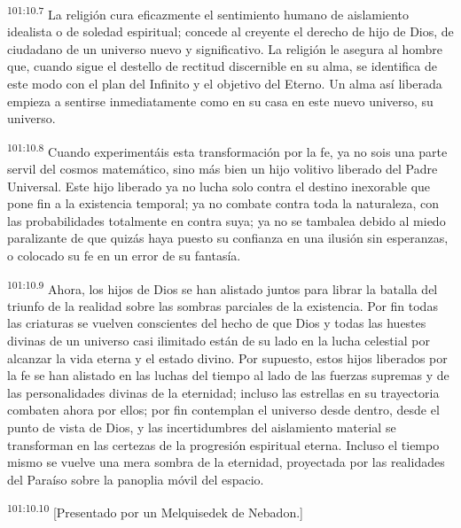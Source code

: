 \documentclass[twoside, 11pt]{book}
\begin{document}
\par
\textsuperscript{101:10.7} La religión cura eficazmente el sentimiento humano de aislamiento idealista o de soledad espiritual; concede al creyente el derecho de hijo de Dios, de ciudadano de un universo nuevo y significativo. La religión le asegura al hombre que, cuando sigue el destello de rectitud discernible en su alma, se identifica de este modo con el plan del Infinito y el objetivo del Eterno. Un alma así liberada empieza a sentirse inmediatamente como en su casa en este nuevo universo, su universo.

\par
\textsuperscript{101:10.8} Cuando experimentáis esta transformación por la fe, ya no sois una parte servil del cosmos matemático, sino más bien un hijo volitivo liberado del Padre Universal. Este hijo liberado ya no lucha solo contra el destino inexorable que pone fin a la existencia temporal; ya no combate contra toda la naturaleza, con las probabilidades totalmente en contra suya; ya no se tambalea debido al miedo paralizante de que quizás haya puesto su confianza en una ilusión sin esperanzas, o colocado su fe en un error de su fantasía.

\par
\textsuperscript{101:10.9} Ahora, los hijos de Dios se han alistado juntos para librar la batalla del triunfo de la realidad sobre las sombras parciales de la existencia. Por fin todas las criaturas se vuelven conscientes del hecho de que Dios y todas las huestes divinas de un universo casi ilimitado están de su lado en la lucha celestial por alcanzar la vida eterna y el estado divino. Por supuesto, estos hijos liberados por la fe se han alistado en las luchas del tiempo al lado de las fuerzas supremas y de las personalidades divinas de la eternidad; incluso las estrellas en su trayectoria combaten ahora por ellos; por fin contemplan el universo desde dentro, desde el punto de vista de Dios, y las incertidumbres del aislamiento material se transforman en las certezas de la progresión espiritual eterna. Incluso el tiempo mismo se vuelve una mera sombra de la eternidad, proyectada por las realidades del Paraíso sobre la panoplia móvil del espacio.

\par
\textsuperscript{101:10.10} [Presentado por un Melquisedek de Nebadon.]
\end{document}
